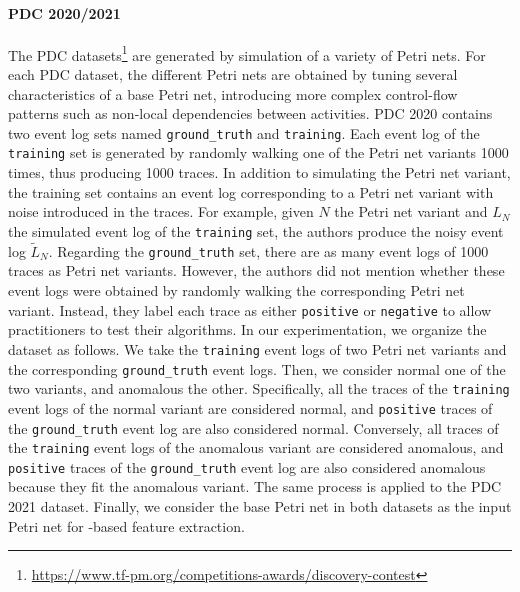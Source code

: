 \paragraph{PDC 2020/2021}
The PDC datasets\footnote{\url{https://www.tf-pm.org/competitions-awards/discovery-contest}} are generated by simulation of a variety of Petri nets. For each PDC dataset, the different Petri nets are obtained by tuning several characteristics of a base Petri net, introducing more complex control-flow patterns such as non-local dependencies between activities. PDC 2020 contains two event log sets named \texttt{ground\_truth} and \texttt{training}. Each event log of the \texttt{training} set is generated by randomly walking one of the Petri net variants 1000 times, thus producing 1000 traces. In addition to simulating the Petri net variant, the training set contains an event log corresponding to a Petri net variant with noise introduced in the traces. For example, given $N$ the Petri net variant and $L_N$ the simulated event log of the \texttt{training} set, the authors produce the noisy event log $\tilde{L}_N$.
Regarding the \texttt{ground\_truth} set, there are as many event logs of 1000 traces as Petri net variants. However, the authors did not mention whether these event logs were obtained by randomly walking the corresponding Petri net variant. Instead, they label each trace as either \texttt{positive} or \texttt{negative} to allow practitioners to test their algorithms. In our experimentation, we organize the dataset as follows. We take the \texttt{training} event logs of two Petri net variants and the corresponding \texttt{ground\_truth} event logs. Then, we consider normal one of the two variants, and anomalous the other. Specifically, all the traces of the \texttt{training} event logs of the normal variant are considered normal, and \texttt{positive} traces of the \texttt{ground\_truth} event log are also considered normal. Conversely, all traces of the \texttt{training} event logs of the anomalous variant are considered anomalous, and \texttt{positive} traces of the \texttt{ground\_truth} event log are also considered anomalous because they fit the anomalous variant. The same process is applied to the PDC 2021 dataset. Finally, we consider the base Petri net in both datasets as the input Petri net for  -based feature extraction.

